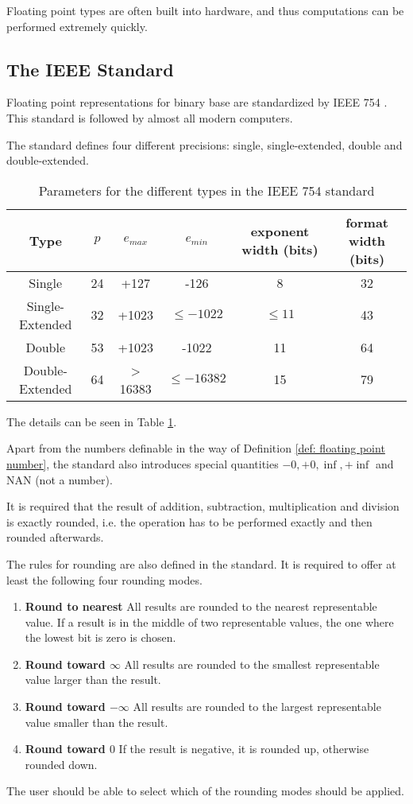 Floating point types are often built into hardware, and thus computations can
be performed extremely quickly.
\subsection{The IEEE Standard}
	Floating point representations for binary base are standardized by IEEE 754 \cite{ieee}. 
	This standard is followed by almost all modern computers.

	The standard defines four different precisions: single, single-extended, double and double-extended.
  \begin{table}
	  	\centering
	    \begin{tabular}{ | c || c | c | c | c | c | }
	    \hline
	    Type & $p$ & $e_{max}$ & $e_{min}$ & exponent width (bits) & format width (bits) \\ \hline \hline
	    Single & 24 & +127 & -126 & 8 & 32 \\ \hline
	    Single-Extended & 32 & +1023 & $\leq -1022$ & $\leq 11$ & 43 \\ \hline
	    Double & 53 & +1023 & -1022 & 11 & 64 \\ \hline
	    Double-Extended & 64 & > 16383 & $\leq -16382$ & 15 & 79 \\ \hline
	    \end{tabular}
	    \caption{Parameters for the different types in the IEEE 754 standard}\label{table:IEEE floating point}
 \end{table}
 The details can be seen in Table \ref{table:IEEE floating point}.

 Apart from the numbers definable in the way of Definition \ref{def:
 floating point number}, the standard also introduces special quantities $-0, +0, \inf, +\inf$ and NAN (not a number). 
    
	It is required that the result of addition, subtraction, multiplication and division is exactly rounded, 
	i.e. the operation has to be performed exactly and then rounded afterwards.
	
  The rules for rounding are also defined in the standard.
  It is required to offer at least the following four rounding modes.
  \begin{enumerate}
    \item \textbf{Round to nearest} 
      All results are rounded to the nearest representable value. 
      If a result is in the middle of two representable values, the one where the
      lowest bit is zero is chosen.
    \item \textbf{Round toward $\infty$}
      All results are rounded to the smallest representable value larger than
      the result.
    \item \textbf{Round toward $-\infty$}
      All results are rounded to the largest representable value smaller than
      the result.
    \item \textbf{Round toward $0$}
      If the result is negative, it is rounded up, otherwise rounded down.
  \end{enumerate}
  The user should be able to select which of the rounding modes should be
  applied.
